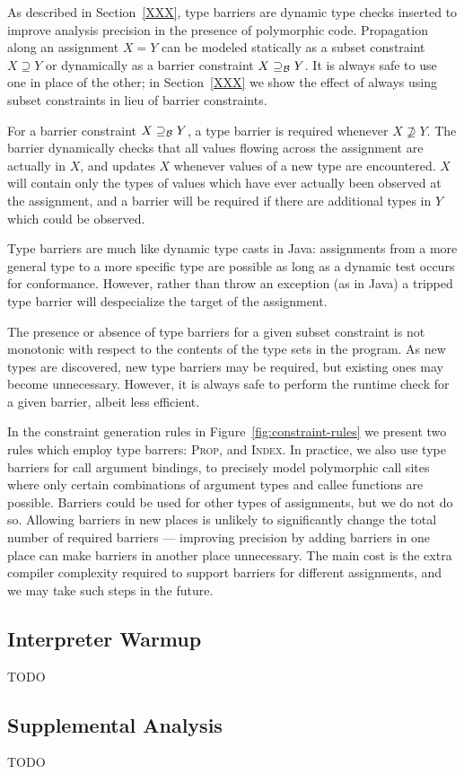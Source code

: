 As described in Section~\ref{XXX}, type barriers are dynamic type checks
inserted to improve analysis precision in the presence
of polymorphic code.
Propagation along an assignment $X = Y$ can be modeled
statically as a subset
constraint $X \supseteq Y$ or dynamically as a barrier constraint
$X \supseteq_\mathcal{B} Y$.
It is always safe to use one in place of the other; in Section~\ref{XXX}
we show the effect of always using subset constraints in lieu of
barrier constraints.

For a barrier constraint $X \supseteq_\mathcal{B} Y$, a type barrier is required whenever
$X \not\supseteq Y$. The barrier dynamically checks that all values
flowing across the assignment are actually in $X$, and updates $X$ whenever
values of a new type are encountered.
$X$ will contain only the types of values which
have ever actually been observed at the assignment, and a barrier will be
required if there are additional types in $Y$ which could be observed.

Type barriers are much like dynamic type casts in Java: assignments from a
more general type to a more specific type are possible as long as a
dynamic test occurs for conformance.
However, rather than throw an exception (as in Java) a tripped type barrier will
despecialize the target of the assignment.

The presence or absence of type barriers for a given subset constraint is not
monotonic with respect to the contents of the type sets in the program.  As
new types are discovered, new type barriers may be required, but existing ones
may become unnecessary.  However, it is always safe to perform the runtime
check for a given barrier, albeit less efficient.

In the constraint generation rules in Figure~\ref{fig:constraint-rules} we
present two rules which employ type barrers:
\textsc{Prop}, and \textsc{Index}. In practice, we also use type barriers for
call argument bindings, to precisely model polymorphic call sites where
only certain combinations of argument types and callee functions are possible.
Barriers could be used for other types of assignments, but we do not do so.
Allowing barriers in new places is unlikely to significantly change the total
number of required barriers --- improving precision by adding barriers in one
place can make barriers in another place unnecessary.
The main cost is the extra compiler complexity required to support
barriers for different assignments, and we may take such steps in the future.

\subsection{Interpreter Warmup}

TODO

\subsection{Supplemental Analysis}

TODO

